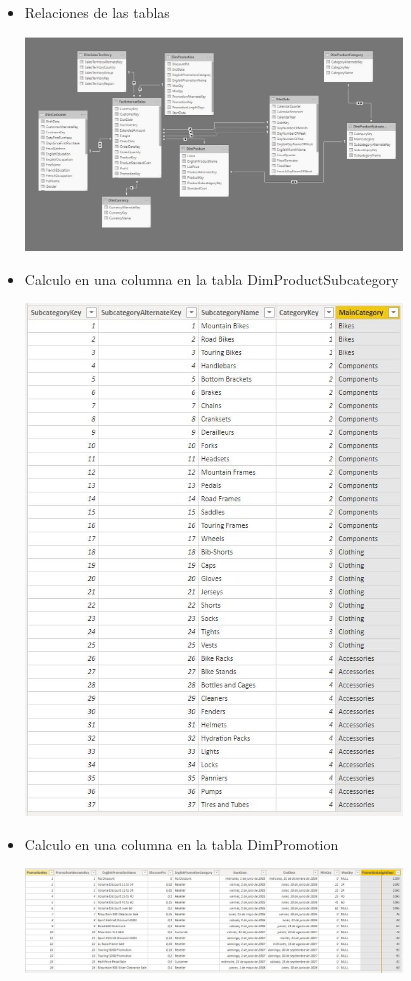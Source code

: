 \begin{itemize}
	\item Relaciones de las tablas
	\begin{center}
	\includegraphics[width=10cm]{./Imagenes/4} 
	\end{center}
\end{itemize} 

\begin{itemize}
	\item Calculo en una columna en la tabla DimProductSubcategory
	\begin{center}
	\includegraphics[width=10cm]{./Imagenes/5} 
	\end{center}
\end{itemize} 

\begin{itemize}
	\item Calculo en una columna en la tabla DimPromotion
	\begin{center}
	\includegraphics[width=10cm]{./Imagenes/6} 
	\end{center}
\end{itemize} 

